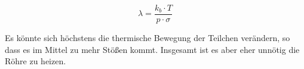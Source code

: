 \documentclass[a4paper,titlepage]{scrartcl}
\numberwithin{equation}{section}
\begin{document}
\begin{equation*}
\lambda = \frac{k_b \cdot T}{p \cdot \sigma}
\end{equation*}

 Es könnte sich höchstens die thermische Bewegung der Teilchen verändern, so dass es im Mittel zu mehr Stößen kommt. Insgesamt ist es aber eher unnötig die Röhre zu heizen.
 
\newpage


\end{document}
